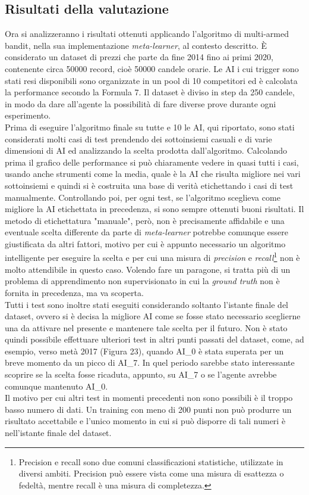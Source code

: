 \documentclass[a4paper,12pt]{report}
\begin{document}
\begin{fig}
\chapter{Risultati della valutazione}
Ora si analizzeranno i risultati ottenuti applicando l'algoritmo di multi-armed bandit, nella sua implementazione \textit{meta-learner}, al contesto descritto. È considerato un dataset di prezzi che parte da fine 2014 fino ai primi 2020, contenente circa 50000 record, cioè 50000 candele orarie. Le AI i cui trigger sono stati resi disponibili sono organizzate in un pool di 10 competitori ed è calcolata la performance secondo la Formula 7. Il dataset è diviso in step da 250 candele, in modo da dare all'agente la possibilità di fare diverse prove durante ogni esperimento.\\ Prima di eseguire l'algoritmo finale su tutte e 10 le AI, qui riportato, sono stati considerati molti casi di test prendendo dei sottoinsiemi casuali e di varie dimensioni di AI ed analizzando la scelta prodotta dall'algoritmo. Calcolando prima il grafico delle performance si può chiaramente vedere in quasi tutti i casi, usando anche strumenti come la media, quale è la AI che risulta migliore nei vari sottoinsiemi e quindi si è costruita una base di verità etichettando i casi di test manualmente. Controllando poi, per ogni test, se l'algoritmo sceglieva come migliore la AI etichettata in precedenza, si sono sempre ottenuti buoni risultati. Il metodo di etichettatura "manuale", però, non è precisamente affidabile e una eventuale scelta differente da parte di \textit{meta-learner} potrebbe comunque essere giustificata da altri fattori, motivo per cui è appunto necessario un algoritmo intelligente per eseguire la scelta e per cui una misura di \textit{precision} e \textit{recall}\footnote{Precision e recall sono due comuni classificazioni statistiche, utilizzate in diversi ambiti. Precision può essere vista come una misura di esattezza o fedeltà, mentre recall è una misura di completezza.} non è molto attendibile in questo caso. Volendo fare un paragone, si tratta più di un problema di apprendimento non supervisionato in cui la \textit{ground truth} non è fornita in precedenza, ma va scoperta.\\Tutti i test sono inoltre stati eseguiti considerando soltanto l'istante finale del dataset, ovvero si è decisa la migliore AI come se fosse stato necessario sceglierne una da attivare nel presente e mantenere tale scelta per il futuro. Non è stato quindi possibile effettuare ulteriori test in altri punti passati del dataset, come, ad esempio, verso metà 2017 (Figura 23), quando AI\_0 è stata superata per un breve momento da un picco di AI\_7. In quel periodo sarebbe stato interessante scoprire se la scelta fosse ricaduta, appunto, su AI\_7 o se l'agente avrebbe comunque mantenuto AI\_0.\\ Il motivo per cui altri test in momenti precedenti non sono possibili è il troppo basso numero di dati. Un training con meno di 200 punti non può produrre un risultato accettabile e l'unico momento in cui si può disporre di tali numeri è nell'istante finale del dataset.

\end{fig}
\end{document}
